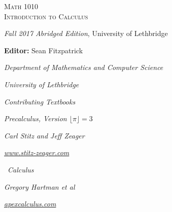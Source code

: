 
\hskip 125pt\begin{minipage}{\textwidth}
\begin{flushright}

\textsc{{\Huge Math 1010 \\
Introduction to Calculus}} \\

\bigskip

\textsl{\Large Fall 2017 Abridged Edition}, 
{\Large University of Lethbridge}\\


\bigskip

\Large
\vspace{1in}

\textbf{Editor:} Sean Fitzpatrick

\emph{\large Department of Mathematics and Computer Science}

\emph{\large University of Lethbridge}\vskip15pt

\parbox{200pt}{\textit{Contributing Textbooks}}\hskip 2cm \phantom{.}

\vspace{0.5in}

\textit{Precalculus, Version $\lfloor \pi\rfloor = 3$}

\emph{\large Carl Stitz and Jeff Zeager}

\emph{\large \href{http://www.stitz-zeager.com}{www.stitz-zeager.com}}\vskip 15pt

\apex\ \textit{Calculus}

\emph{\large Gregory Hartman et al}

\emph{\large \href{http://www.apexcalculus.com}{apexcalculus.com}}\vskip 15pt


\normalsize
\end{flushright}
\end{minipage}

